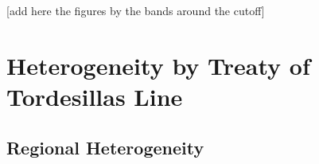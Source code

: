 \documentclass[11pt]{article}
\begin{document}
\clearpage

[add here the figures by the bands around the cutoff]

\clearpage

\section*{Heterogeneity by Treaty of Tordesillas Line}



\clearpage

\subsection{Regional Heterogeneity}



\clearpage


%

%


%







\clearpage



\clearpage

\end{document}

